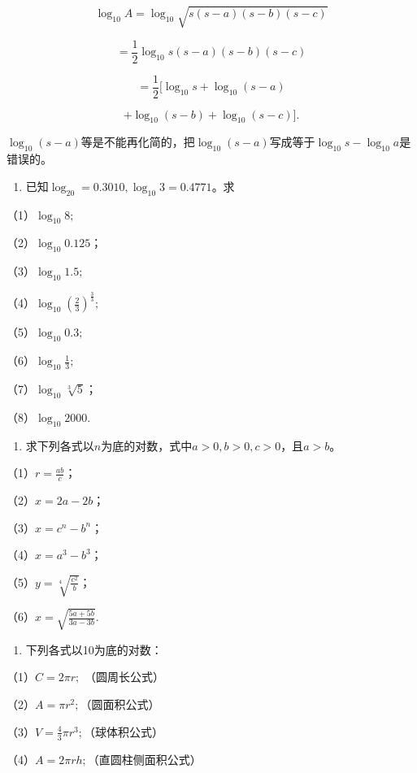 \[
\log_{10} A = \log_{10} \sqrt{s (s - a) (s - b) (s - c)}
\]

\[
= \frac{1}{2} \log_{10} s (s - a) (s - b) (s - c)
\]

\[
= \frac{1}{2} [ \log_{10} s + \log_{10} (s - a)
\]

\[
+ \log_{10} (s - b) + \log_{10} (s - c) ].
\]

\(\log_{10}(s - a)\)等是不能再化简的，把\(\log_{10}(s - a)\)写成等于\(\log_{10}s - \log_{10}a\)是错误的。

\begin{enumerate}
\item
  已知\(\log_{20} = 0.3010, \log_{10}3 = 0.4771\)。求
\end{enumerate}

（1）\(\log_{10}8;\)

（2）\(\log_{10}0.125\)；

（3）\(\log_{10}1.5;\)

（4）\(\log_{10}\left(\frac{2}{3}\right)^{\frac{3}{3}};\)

（5）\(\log_{10}0.3;\)

（6）\(\log_{10}\frac{1}{3};\)

（7）\(\log_{10}\sqrt[3]{5}\)；

（8）\(\log_{10}2000.\)

\begin{enumerate}[start=2]
\item
  求下列各式以\(n\)为底的对数，式中\(a > 0, b > 0, c > 0\)，且\(a > b\)。
\end{enumerate}

（1）\(r = \frac{a b}{c}\)；

（2）\(x = 2a - 2b\)；

（3）\(x = c^{n} - b^{n}\)；

（4）\(x = a^3 - b^3\)；

（5）\(y = \sqrt[4]{\frac{c^2}{b}}\)；

（6）\(x = \sqrt{\frac{5a + 5b}{3a - 3b}}.\)

\begin{enumerate}[start=5]
\item
  下列各式以10为底的对数：
\end{enumerate}

（1）\(C = 2\pi r;\) （圆周长公式）

（2）\(A = \pi r^2;\)（圆面积公式）

（3）\(V = \frac{4}{3}\pi r^3;\)（球体积公式）

（4）\(A = 2\pi r h;\)（直圆柱侧面积公式）

